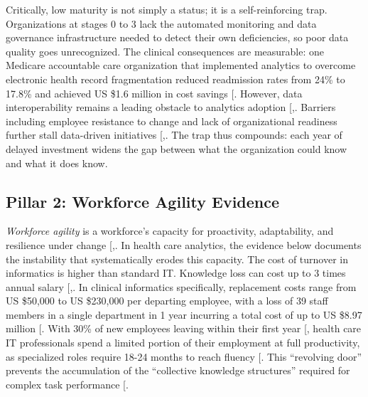 \documentclass[
  american,
  11pt,
  letterpaper,
  oneside  ,captions=tableheading
]{scrartcl}
\begin{document}
Critically, low maturity is not simply a status; it is a
self-reinforcing trap. Organizations at stages 0 to 3 lack the automated
monitoring and data governance infrastructure needed to detect their own
deficiencies, so poor data quality goes unrecognized. The clinical
consequences are measurable: one Medicare accountable care organization
that implemented analytics to overcome electronic health record
fragmentation reduced readmission rates from 24\% to 17.8\% and achieved
US \$1.6 million in cost savings {[}\citeproc{ref-latrella2024}{47}{]}.
However, data interoperability remains a leading obstacle to analytics
adoption {[},\citeproc{ref-zhang2024}{4}{]}.
Barriers including employee resistance to change and lack of
organizational readiness further stall data-driven initiatives
{[},\citeproc{ref-kamble2019}{49}{]}. The
trap thus compounds: each year of delayed investment widens the gap
between what the organization could know and what it does know.

\subsection{Pillar 2: Workforce Agility
Evidence}\label{pillar-2-workforce-agility-evidence}

\emph{Workforce agility} is a workforce's capacity for proactivity,
adaptability, and resilience under change
{[},\citeproc{ref-tessarini2021}{51}{]}. In
health care analytics, the evidence below documents the instability that
systematically erodes this capacity. The cost of turnover in informatics
is higher than standard IT. Knowledge loss can cost up to 3 times annual
salary
{[},\citeproc{ref-wynendaele2025}{52}{]}.
In clinical informatics specifically, replacement costs range from US
\$50,000 to US \$230,000 per departing employee, with a loss of 39 staff
members in a single department in 1 year incurring a total cost of up to
US \$8.97 million {[}\citeproc{ref-hackney2024}{53}{]}. With 30\% of new
employees leaving within their first year
{[}\citeproc{ref-nsi2025}{23}{]}, health care IT professionals spend a
limited portion of their employment at full productivity, as specialized
roles require 18-24 months to reach fluency
{[}\citeproc{ref-ledikwe2013}{17}{]}. This ``revolving door'' prevents
the accumulation of the ``collective knowledge structures'' required for
complex task performance {[}\citeproc{ref-rao2006}{13}{]}.
\end{document}
